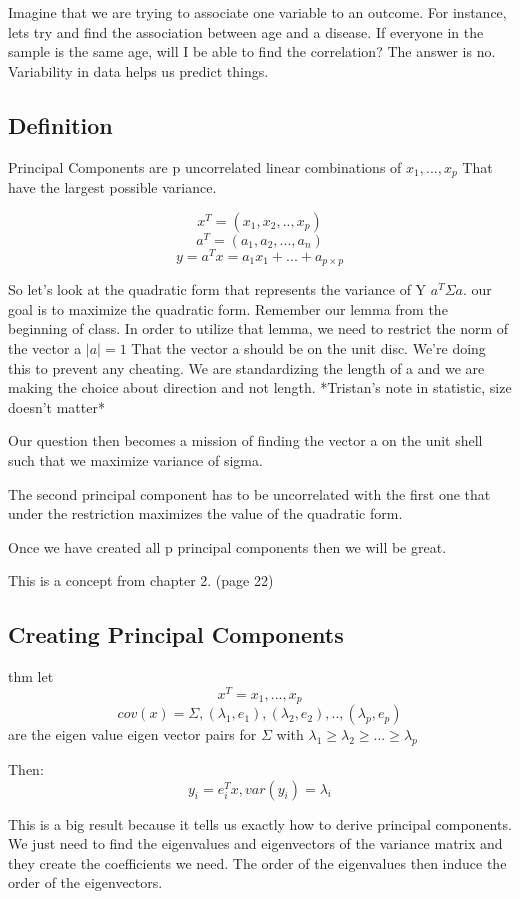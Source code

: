  Imagine that we are trying to associate one variable to an outcome. For instance, lets try and find the association between age and a disease. If everyone in the sample is the same age, will I be able to find the correlation? The answer is no. Variability in data helps us predict things.
 
 \subsection{Definition}
 Principal Components are p uncorrelated linear combinations of $x_1,...,x_p$ That have the largest possible variance.
 
 \[x^T=(x_1,x_2,..,x_p)\]
 \[a^T = (a_1,a_2,...,a_n)\]
 \[y=a^Tx = a_1x_1+...+a_{p \times p}\]
 
 So let's look at the quadratic form that represents the variance of Y $a^T\Sigma a$. our goal is to maximize the quadratic form. Remember our lemma from the beginning of class. In order to utilize that lemma, we need to restrict the norm of the vector a $|a| =1$ That the vector a should be on the unit disc. We're doing this to prevent any cheating. We are standardizing the length of a and we are making the choice about direction and not length. *Tristan's note in statistic, size doesn't matter*
 
 
 Our question then becomes a mission of finding the vector a on the unit shell such that we maximize variance of sigma.
 
 The second principal component has to be uncorrelated with the first one that under the restriction maximizes the value of the quadratic form. 
 
 Once we have created all p principal components then we will be great.
 
 This is a concept from chapter 2. (page 22)
 
 \subsection{Creating Principal Components}
 thm let 
 \[x^T = x_1,..., x_p\]
 \[cov(x) = \Sigma, (\lambda_1,e_1),(\lambda_2,e_2),..,(\lambda_p,e_p)\] are the eigen value eigen vector pairs for $\Sigma$ with $\lambda_1 \geq \lambda_2 \geq ... \geq \lambda_p$
 
 Then:
 \[y_i = e_i^Tx, var(y_i) =\lambda_i\]

This is a big result because it tells us exactly how to derive principal components. We just need to find the eigenvalues and eigenvectors of the variance matrix and they create the coefficients we need. The order of the eigenvalues then induce the order of the eigenvectors.

